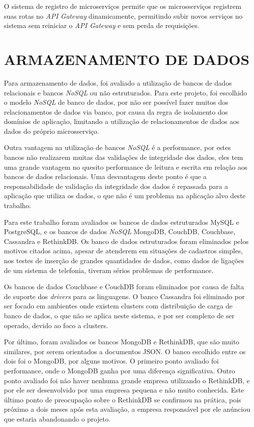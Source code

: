 O sistema de registro de microserviços permite que os microsserviços registrem
suas rotas no \emph{API Gateway} dinamicamente, permitindo subir novos serviços
no sistema sem reiniciar o \emph{API Gateway} e sem perda de requisições.

\section{ARMAZENAMENTO DE DADOS}

Para armazenamento de dados, foi avaliado a utilização de bancos de dados
relacionais e bancos \emph{NoSQL} ou não estruturados. Para este projeto, foi
escolhido o modelo \emph{NoSQL} de banco de dados, por não ser possível
fazer muitos dos relacionamentos de dados via banco, por causa da regra
de isolamento dos domínios de aplicação, limitando a utilização de
relacionamentos de dados aos dados do próprio microsserviço.

Outra vantagem na utilização de bancos \emph{NoSQL} é a performance, por
estes bancos não realizarem muitas das validações de integridade dos dados,
eles tem uma grande vantagem no quesito performance de leitura e escrita em
relação aos bancos de dados relacionais. Uma desvantagem deste ponto é que
a responsabilidade de validação da integridade dos dados é repassada para
a aplicação que utiliza os dados, o que não é um problema na aplicação alvo
deste trabalho.

Para este trabalho foram avaliados os bancos de dados estruturados MySQL e
PostgreSQL, e os bancos de dados \emph{NoSQL} MongoDB, CouchDB, Couchbase,
Cassandra e RethinkDB. Os banco de dados estruturados foram eliminados
pelos motivos citados acima, apesar de atenderem em situações de cadastros
simples, nos testes de inserção de grandes quantidades de dados, como
dados de ligações de um sistema de telefonia, tiveram sérios problemas de
performance.

Os bancos de dados Couchbase e CouchDB foram eliminados por causa de falta
de suporte dos \emph{drivers} para as linguagens. O banco Cassandra foi
eliminado por ser focado em ambientes onde existem clusters com distribuição
de carga de banco de dados, o que não se aplica neste sistema, e por
ser complexo de ser operado, devido ao foco a clusters.

Por último, foram avaliados os bancos MongoDB e RethinkDB, que são muito
similares, por serem orientados a documentos \ac{JSON}. O banco escolhido
entre os dois foi o MongoDB, por alguns motivos. O primeiro ponto avaliado
foi performance, onde o MongoDB ganha por uma diferença significativa. Outro
ponto avaliado foi não haver nenhuma grande empresa utilizando o RethinkDB, e
por ele ser desenvolvido por uma empresa pequena e não muito conhecida.
Este último ponto de preocupação sobre o RethinkDB se confirmou na prática,
pois próximo a dois meses após esta avaliação, a empresa responsável por ele
anúnciou que estaria abandonando o projeto.

